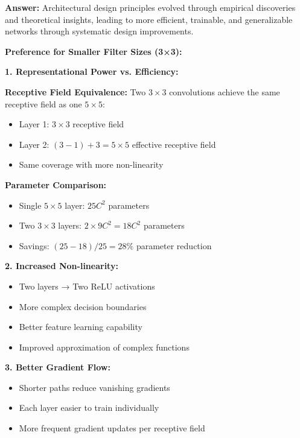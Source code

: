 \documentclass[12pt]{article}
\newcommand{\answer}[1]{{\color{answercolor}\textbf{Answer:} #1}}
\newcommand{\explanation}[1]{{\color{explanationcolor}#1}}
\begin{document}
\begin{enumerate}[(a)]
    \answer{Architectural design principles evolved through empirical discoveries and theoretical insights, leading to more efficient, trainable, and generalizable networks through systematic design improvements.}
    
    \explanation{
    \textbf{Preference for Smaller Filter Sizes (3×3):}
    
    \textbf{1. Representational Power vs. Efficiency:}
    
    \textbf{Receptive Field Equivalence:}
    Two $3 \times 3$ convolutions achieve the same receptive field as one $5 \times 5$:
    \begin{itemize}
        \item Layer 1: $3 \times 3$ receptive field
        \item Layer 2: $(3-1) + 3 = 5 \times 5$ effective receptive field
        \item Same coverage with more non-linearity
    \end{itemize}
    
    \textbf{Parameter Comparison:}
    \begin{itemize}
        \item Single $5 \times 5$ layer: $25C^2$ parameters
        \item Two $3 \times 3$ layers: $2 \times 9C^2 = 18C^2$ parameters
        \item Savings: $(25-18)/25 = 28\%$ parameter reduction
    \end{itemize}
    
    \textbf{2. Increased Non-linearity:}
    \begin{itemize}
        \item Two layers → Two ReLU activations
        \item More complex decision boundaries
        \item Better feature learning capability
        \item Improved approximation of complex functions
    \end{itemize}
    
    \textbf{3. Better Gradient Flow:}
    \begin{itemize}
        \item Shorter paths reduce vanishing gradients
        \item Each layer easier to train individually
        \item More frequent gradient updates per receptive field
    \end{itemize}
    
}
\end{enumerate}
\end{document}
